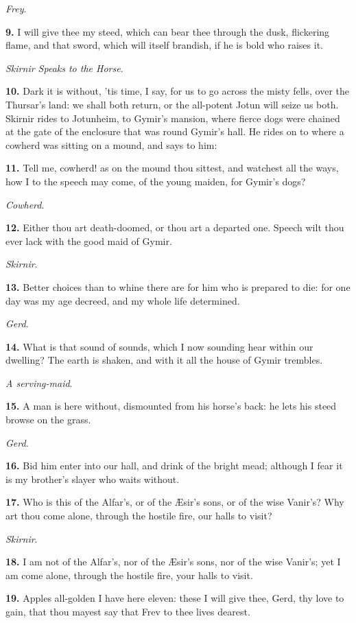 \emph{Frey}.

\textbf{9.} I will give thee my steed, which can bear thee through the dusk,
flickering flame, and that sword, which will itself brandish, if he is
bold who raises it.

\emph{Skirnir Speaks to the Horse}.

\textbf{10.} Dark it is without, 'tis time, I say, for us to go across the
misty fells, over the Thursar's land: we shall both return, or the
all-potent Jotun will seize us both. Skirnir rides to Jotunheim, to
Gymir's mansion, where fierce dogs were chained at the gate of the
enclosure that was round Gymir's hall. He rides on to where a cowherd
was sitting on a mound, and says to him:

\textbf{11.} Tell me, cowherd! as on the mound thou sittest, and watchest all
the ways, how I to the speech may come, of the young maiden, for
Gymir's dogs?

\emph{Cowherd}.

\textbf{12.} Either thou art death-doomed, or thou art a departed one. Speech
wilt thou ever lack with the good maid of Gymir.

\emph{Skirnir}.

\textbf{13.} Better choices than to whine there are for him who is prepared
to die: for one day was my age decreed, and my whole life determined.

\emph{Gerd}.

\textbf{14.} What is that sound of sounds, which I now sounding hear within
our dwelling? The earth is shaken, and with it all the house of Gymir
trembles.

\emph{A serving-maid}.

\textbf{15.} A man is here without, dismounted from his horse's back: he lets
his steed browse on the grass.

\emph{Gerd}.

\textbf{16.} Bid him enter into our hall, and drink of the bright mead;
although I fear it is my brother's slayer who waits without.

\textbf{17.} Who is this of the Alfar's, or of the Æsir's sons, or of the
wise Vanir's? Why art thou come alone, through the hostile fire, our
halls to visit?

\emph{Skirnir}.

\textbf{18.} I am not of the Alfar's, nor of the Æsir's sons, nor of the wise
Vanir's; yet I am come alone, through the hostile fire, your halls to
visit.

\textbf{19.} Apples all-golden I have here eleven: these I will give thee,
Gerd, thy love to gain, that thou mayest say that Frev to thee lives
dearest.

